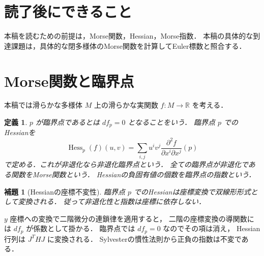 \documentclass[a5paper,10pt,onecolumn]{jsarticle}
\makeatletter
\theoremstyle{mathnotetheorem}
\newtheorem{definition}[theorem]{定義}
\newtheorem{lemma}[theorem]{補題}
\renewcommand{\proofname}{証明}
\renewenvironment{proof}[1][\proofname]{%
  \par\pushQED{\qed}\normalfont\topsep4\p@\@plus2\p@\relax
  \trivlist\item[\hskip\labelsep\bfseries #1]\ignorespaces
}{\popQED\endtrivlist\@endpefalse}
\makeatother
\begin{document}
\section*{読了後にできること}
本稿を読むための前提は，Morse関数，Hessian，Morse指数．
本稿の具体的な到達課題は，具体的な閉多様体のMorse関数を計算してEuler標数と照合する．


\section{Morse関数と臨界点}
本稿では滑らかな多様体 $M$ 上の滑らかな実関数
$f:M\to\mathbb R$ を考える．
\begin{definition}
$p$ が臨界点であるとは $df_p=0$ となることをいう．
臨界点 $p$ でのHessianを
\[
 \operatorname{Hess}_p(f)(u,v)
 =\sum_{i,j}u^iv^j\frac{\partial^2f}{\partial x^i\partial x^j}(p)
\]
で定める．これが非退化なら非退化臨界点という．
全ての臨界点が非退化である関数をMorse関数という．
Hessianの負固有値の個数を臨界点の指数という．
\end{definition}
\begin{lemma}[Hessianの座標不変性]
臨界点 $p$ でのHessianは座標変換で双線形形式として変換される．
従って非退化性と指数は座標に依存しない．
\end{lemma}
\begin{proof}
$y$ 座標への変換で二階微分の連鎖律を適用すると，
二階の座標変換の導関数には $df_p$ が係数として掛かる．
臨界点では $df_p=0$ なのでその項は消え，
Hessian行列は $J^THJ$ に変換される．
Sylvesterの慣性法則から正負の指数は不変である．
\end{proof}
\end{document}
